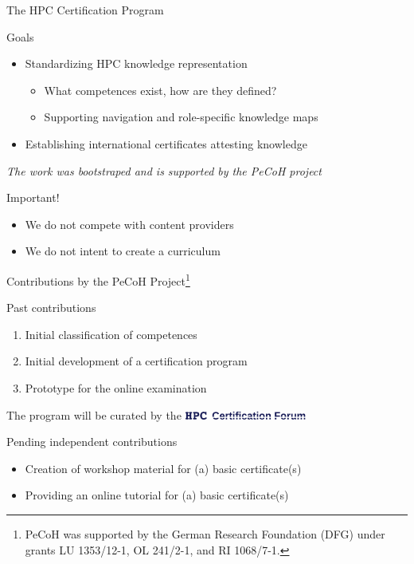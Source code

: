 \documentclass[compress,aspectratio=169]{beamer}
\begin{document}
\begin{frame}{The HPC Certification Program}
		\begin{block}{Goals}
			\begin{itemize}
				\item Standardizing HPC knowledge representation
          \begin{itemize}
						\item What competences exist, how are they defined?
            \item Supporting navigation and role-specific knowledge maps
          \end{itemize}
				\item Establishing international certificates attesting knowledge
			\end{itemize}
		\end{block}

		\textit{The work was bootstraped and is supported by the PeCoH project}
		\begin{block}{Important!}
			\begin{itemize}
				\item We do not compete with content providers
				\item We do not intent to create a curriculum
			\end{itemize}
		\end{block}



\end{frame}


\begin{frame}{Contributions by the PeCoH Project\footnote[frame]{PeCoH was supported by the German Research Foundation (DFG) under grants LU 1353/12-1, OL 241/2-1, and RI 1068/7-1.}}
	\begin{block}{Past contributions}
		\vspace*{-2mm}
		\begin{enumerate}
			\item Initial classification of competences
			\item Initial development of a certification program
			\item Prototype for the online examination
		\end{enumerate}
	\end{block}

  The program will be curated by the \includegraphics[width=0.3\textwidth]{hpccf-full}

  \begin{block}{Pending independent contributions}
    \begin{itemize}
			\item Creation of workshop material for (a) basic certificate(s)
			\item Providing an online tutorial for (a) basic certificate(s)
    \end{itemize}
  \end{block}
\end{frame}
\end{document}
